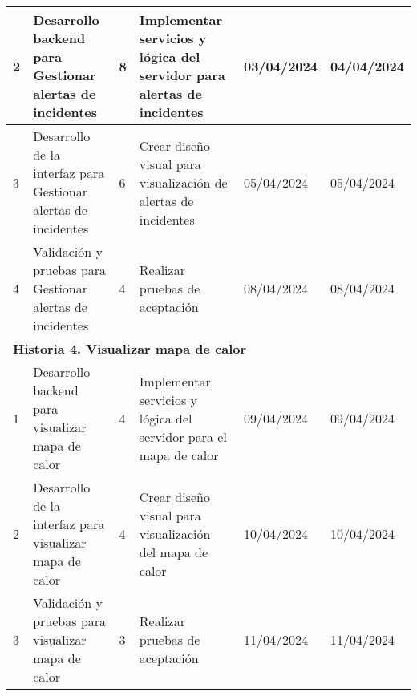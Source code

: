 \begin{longtable}{|p{0.5cm}|p{2cm}|p{1cm}|p{3cm}|p{1cm}|p{1cm}|}
    2                                        & Desarrollo backend para Gestionar alertas de incidentes                   & 8                                                              & Implementar servicios y lógica del servidor para alertas de incidentes  & 03/04/2024                                                    & 04/04/2024                                                          \\ \hline
    3                                        & Desarrollo de la interfaz para Gestionar alertas de incidentes            & 6                                                              & Crear diseño visual para visualización de alertas de incidentes         & 05/04/2024                                                    & 05/04/2024                                                          \\ \hline
    4                                        & Validación y pruebas para Gestionar alertas de incidentes                 & 4                                                              & Realizar pruebas de aceptación                                          & 08/04/2024                                                    & 08/04/2024                                                          \\ \hline
    \multicolumn{6}{|l|}{\textbf{Historia 4. Visualizar mapa de calor}}                                                                                                                                                                                                                                                                                                                                    \\ \hline
    1                                        & Desarrollo backend para visualizar mapa de calor                           & 4                                                              & Implementar servicios y lógica del servidor para el mapa de calor       & 09/04/2024                                                    & 09/04/2024                                                          \\ \hline
    2                                        & Desarrollo de la interfaz para visualizar mapa de calor                    & 4                                                              & Crear diseño visual para visualización del mapa de calor                & 10/04/2024                                                    & 10/04/2024                                                          \\ \hline
    3                                        & Validación y pruebas para visualizar mapa de calor                         & 3                                                              & Realizar pruebas de aceptación                                          & 11/04/2024                                                    & 11/04/2024                                                          \\ \hline
\end{longtable}